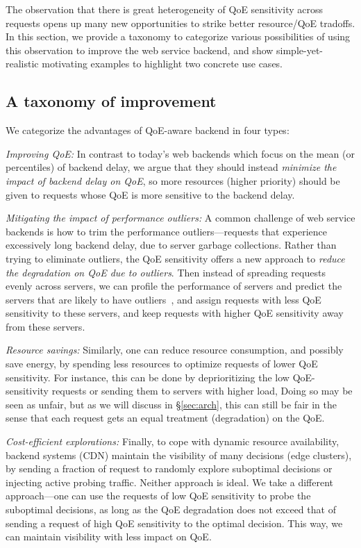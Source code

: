The observation that there is great heterogeneity of QoE sensitivity across requests opens up many new opportunities to strike better resource/QoE tradoffs. 
In this section, we provide a taxonomy to categorize various possibilities of using this observation to improve the web service backend, and show simple-yet-realistic motivating examples to highlight two concrete use cases.

\subsection{A taxonomy of improvement}

We categorize the advantages of QoE-aware backend in four types:
\begin{packeditemize}
\item {\em Improving QoE:} 
In contrast to today's web backends which focus on the mean (or percentiles) of backend delay, we argue that they should instead {\em minimize the impact of backend delay on QoE}, so more resources (\eg higher priority) should be given to requests whose QoE is more sensitive to the backend delay. 
    
\item {\em Mitigating the impact of performance outliers:} 
A common challenge of web service backends is how to trim the performance outliers---requests that experience excessively long backend delay, \eg due to server garbage collections. 
Rather than trying to eliminate outliers, the QoE sensitivity offers a new approach to {\em reduce the degradation on QoE due to outliers}.
Then instead of spreading requests evenly across servers, we can profile the performance of servers and predict the servers that are likely to have outliers~\cite{ganesh's trimming}, and assign requests with less QoE sensitivity to these servers, and keep requests with higher QoE sensitivity away from these servers. 
    
\item {\em Resource savings:}
Similarly, one can reduce resource consumption, and possibly save energy, by spending less resources to optimize requests of lower QoE sensitivity. For instance, this can be done by deprioritizing the low QoE-sensitivity requests or sending them to servers with higher load, 
Doing so may be seen as unfair, but as we will discuss in \S\ref{sec:arch}, this can still be fair in the sense that each request gets an equal treatment (degradation) on the QoE.
    
\item {\em Cost-efficient explorations:}
Finally, to cope with dynamic resource availability, backend systems (\eg CDN) maintain the visibility of many decisions (\eg edge clusters), by sending a fraction of request to randomly explore suboptimal decisions or injecting active probing traffic.
Neither approach is ideal. 
We take a different approach---one can use the requests of low QoE sensitivity to probe the suboptimal decisions, as long as the QoE degradation does not exceed that of sending a request of high QoE sensitivity to the optimal decision.
This way, we can maintain visibility with less impact on QoE.
\end{packeditemize}
